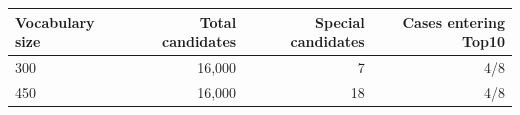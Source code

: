 \begin{tabular*}{\linewidth}{@{\extracolsep{\fill}}lrrr@{}}\toprule
Vocabulary size & Total candidates & Special candidates & Cases entering Top10\\\midrule
300 & 16,000 & 7 & 4/8\\
450 & 16,000 & 18 & 4/8\\
\bottomrule\end{tabular*}